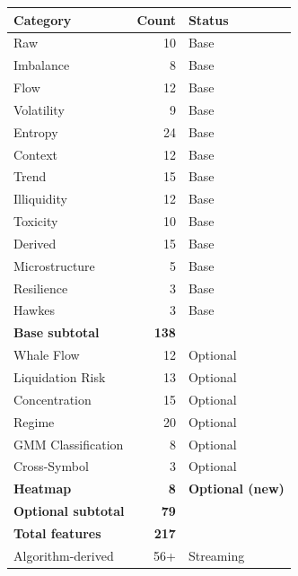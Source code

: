 \documentclass[11pt,a4paper]{article}
\begin{document}
\begin{center}
\begin{tabular}{lrl}
\toprule
\textbf{Category} & \textbf{Count} & \textbf{Status} \\
\midrule
Raw & 10 & Base \\
Imbalance & 8 & Base \\
Flow & 12 & Base \\
Volatility & 9 & Base \\
Entropy & 24 & Base \\
Context & 12 & Base \\
Trend & 15 & Base \\
Illiquidity & 12 & Base \\
Toxicity & 10 & Base \\
Derived & 15 & Base \\
Microstructure & 5 & Base \\
Resilience & 3 & Base \\
Hawkes & 3 & Base \\
\midrule
\textbf{Base subtotal} & \textbf{138} & \\
\midrule
Whale Flow & 12 & Optional \\
Liquidation Risk & 13 & Optional \\
Concentration & 15 & Optional \\
Regime & 20 & Optional \\
GMM Classification & 8 & Optional \\
Cross-Symbol & 3 & Optional \\
\textbf{Heatmap} & \textbf{8} & \textbf{Optional (new)} \\
\midrule
\textbf{Optional subtotal} & \textbf{79} & \\
\midrule
\textbf{Total features} & \textbf{217} & \\
\midrule
Algorithm-derived & 56+ & Streaming \\
\bottomrule
\end{tabular}
\end{center}
\end{document}
